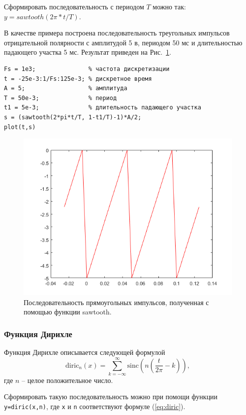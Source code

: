 \documentclass[12pt,a4paper]{article}
\begin{document}
Сформировать последовательность с периодом $T$ можно так: $y=sawtooth(2\pi*t/T)$.

В качестве примера построена  последовательность треугольных импульсов отрицательной полярности с амплитудой 5 в, периодом 50 мс и длительностью падающего участка 5 мс. Результат приведен на Рис.~\ref{fig:img_sawtooth}.
\begin{verbatim}
Fs = 1e3;               % частота дискретизации
t = -25e-3:1/Fs:125e-3; % дискретное время
A = 5;                  % амплитуда
T = 50e-3;              % период
t1 = 5e-3;              % длительность падающего участка
s = (sawtooth(2*pi*t/T, 1-t1/T)-1)*A/2;
plot(t,s)
\end{verbatim}
\begin{figure}[!ht]
  \centering
  \includegraphics[width=\linewidth]{img_sawtooth}
  \caption{Последовательность прямоугольных импульсов, полученная с помощью функции sawtooth.}
  \label{fig:img_sawtooth}
\end{figure}

\subsubsection{Функция Дирихле}
Функция Дирихле описывается следующей формулой
\begin{equation} \label{eq:diric}
\mathrm{diric}_n(x)=\sum_{k=-\infty}^{\infty} \mathrm{sinc} \left( n \left(\frac{t}{2\pi}-k\right) \right),
\end{equation}
где $n$ -- целое положительное число.

Сформировать такую последовательность можно при помощи функции \verb|y=diric(x,n)|, где \verb|x| и \verb|n| соответствуют формуле (\ref{eq:diric}).
\end{document}
